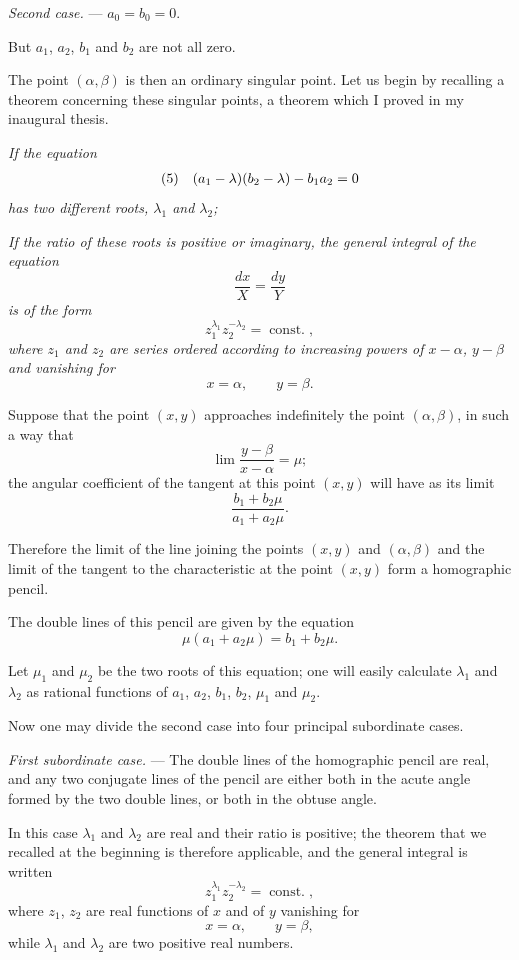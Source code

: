 \documentclass[11pt]{article}
\begin{document}
\emph{Second case.} --- $a_0=b_0=0$.

But $a_1$, $a_2$, $b_1$ and $b_2$ are not all zero.

The point $(\alpha,\beta)$ is then an ordinary singular point. Let us begin by recalling a theorem concerning these singular points, a theorem which I proved in my inaugural thesis.

\emph{If the equation}
\[
\begin{array}{r@{\quad}c}
(5)&(a_1-\lambda)(b_2-\lambda)-b_1a_2=0
\end{array}
\]
\emph{has two different roots, $\lambda_1$ and $\lambda_2$;} 

\emph{If the ratio of these roots is positive or imaginary, the general integral of the equation}
\[
\frac{dx}{X}=\frac{dy}{Y}
\]
\emph{is of the form}
\[
z_1^{\lambda_1}z_2^{-\lambda_2}=\operatorname{const.},
\]
\emph{where $z_1$ and $z_2$ are series ordered according to increasing powers of $x-\alpha$, $y-\beta$ and vanishing for}
\[
x=\alpha,\qquad y=\beta.
\]

Suppose that the point $(x,y)$ approaches indefinitely the point $(\alpha,\beta)$, in such a way that
\[
\lim\frac{y-\beta}{x-\alpha}=\mu;
\]
the angular coefficient of the tangent at this point $(x,y)$ will have as its limit
\[
\frac{b_1+b_2\mu}{a_1+a_2\mu}.
\]

Therefore the limit of the line joining the points $(x,y)$ and $(\alpha,\beta)$ and the limit of the tangent to the characteristic at the point $(x,y)$ form a homographic pencil.

The double lines of this pencil are given by the equation
\[
\mu(a_1+a_2\mu)=b_1+b_2\mu.
\]

Let $\mu_1$ and $\mu_2$ be the two roots of this equation; one will easily calculate $\lambda_1$ and $\lambda_2$ as rational functions of $a_1$, $a_2$, $b_1$, $b_2$, $\mu_1$ and $\mu_2$.

Now one may divide the second case into four principal subordinate cases.

\emph{First subordinate case.} --- The double lines of the homographic pencil are real, and any two conjugate lines of the pencil are either both in the acute angle formed by the two double lines, or both in the obtuse angle.

In this case $\lambda_1$ and $\lambda_2$ are real and their ratio is positive; the theorem that we recalled at the beginning is therefore applicable, and the general integral is written
\[
z_1^{\lambda_1}z_2^{-\lambda_2}=\operatorname{const.},
\]
where $z_1$, $z_2$ are real functions of $x$ and of $y$ vanishing for
\[
x=\alpha,\qquad y=\beta,
\]
while $\lambda_1$ and $\lambda_2$ are two positive real numbers.
\end{document}
